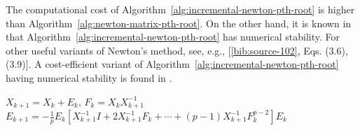 {The computational cost of Algorithm~\ref{alg:incremental-newton-pth-root} is higher than Algorithm~\ref{alg:newton-matrix-pth-root}. On the other hand, it is known in  that Algorithm~\ref{alg:incremental-newton-pth-root} has numerical stability. For other useful variants of Newton's method, see, e.g., [\hyperref[bib:source-102]{\ref*{bib:source-102}}, Eqs. (3.6), (3.9)]. A cost-efficient variant of Algorithm~\ref{alg:incremental-newton-pth-root} having numerical stability is found in .}

\begin{algorithm}[H]\caption{{(Iterative method) The incremental Newton's method for $A^{1/p}$}}\label{alg:incremental-newton-pth-root}\begin{algorithmic}[1]
\State $X_{k+1}=X_k+E_k$, $F_k=X_kX_{k+1}^{-1}$
\State $E_{k+1}=-\frac{1}{p}E_k\left[X_{k+1}^{-1}I+2X_{k+1}^{-1}F_k+\cdots+(p-1)X_{k+1}^{-1}F_k^{p-2}\right]E_k$
\EndFor
\end{algorithmic}\end{algorithm}
